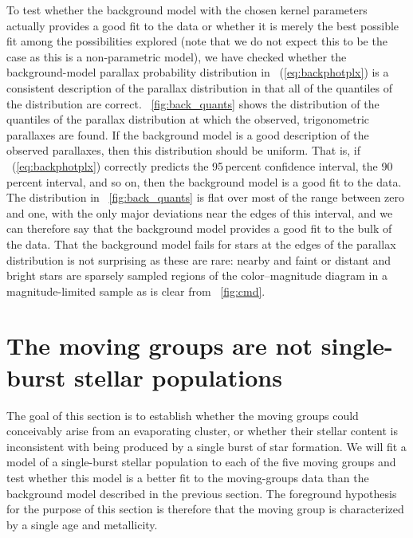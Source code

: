 To test whether the background model with the chosen kernel parameters
actually provides a good fit to the data or whether it is merely the
best possible fit among the possibilities explored (note that we do
not expect this to be the case as this is a non-parametric model), we
have checked whether the background-model parallax probability
distribution in \eqnname~(\ref{eq:backphotplx}) is a consistent
description of the parallax distribution in that all of the quantiles
of the distribution are correct. \figurename~\ref{fig:back_quants}
shows the distribution of the quantiles of the parallax distribution
at which the observed, trigonometric parallaxes are found. If the
background model is a good description of the observed parallaxes,
then this distribution should be uniform. That is, if
\eqnname~(\ref{eq:backphotplx}) correctly predicts the 95\,percent
confidence interval, the 90\,percent interval, and so on, then the
background model is a good fit to the data. The distribution in
\figurename~\ref{fig:back_quants} is flat over most of the range
between zero and one, with the only major deviations near the edges of
this interval, and we can therefore say that the background model
provides a good fit to the bulk of the data. That the background model
fails for stars at the edges of the parallax distribution is not
surprising as these are rare: nearby and faint or distant and bright
stars are sparsely sampled regions of the color--magnitude diagram in
a magnitude-limited sample as is clear from \figurename~\ref{fig:cmd}.

\section{The moving groups are not single-burst stellar populations}\label{sec:ssp}

The goal of this section is to establish whether the moving groups
could conceivably arise from an evaporating cluster, or whether their
stellar content is inconsistent with being produced by a single burst
of star formation. We will fit a model of a single-burst stellar
population to each of the five moving groups and test whether this
model is a better fit to the moving-groups data than the background
model described in the previous section. The foreground hypothesis for
the purpose of this section is therefore that the moving group is
characterized by a single age and metallicity.


